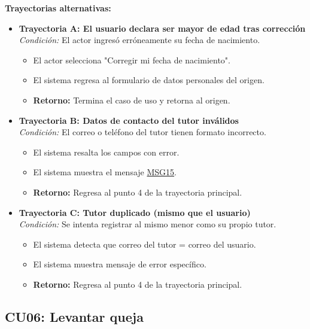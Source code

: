 \begin{appendices}
\textbf{Trayectorias alternativas:}
\begin{itemize}[leftmargin=*]
    \item \textbf{Trayectoria A: El usuario declara ser mayor de edad tras corrección} \\
    \textit{Condición:} El actor ingresó erróneamente su fecha de nacimiento.
    \begin{itemize}[nosep]
        \item[A-1:] El actor selecciona "Corregir mi fecha de nacimiento".
        \item[A-2:] El sistema regresa al formulario de datos personales del origen.
        \item \textbf{Retorno:} Termina el caso de uso y retorna al origen.
    \end{itemize}
    \item \textbf{Trayectoria B: Datos de contacto del tutor inválidos} \\
    \textit{Condición:} El correo o teléfono del tutor tienen formato incorrecto.
    \begin{itemize}[nosep]
        \item[B-1:] El sistema resalta los campos con error.
        \item[B-2:] El sistema muestra el mensaje \hyperlink{msg:MSG15}{MSG15}.
        \item \textbf{Retorno:} Regresa al punto 4 de la trayectoria principal.
    \end{itemize}
    \item \textbf{Trayectoria C: Tutor duplicado (mismo que el usuario)} \\
    \textit{Condición:} Se intenta registrar al mismo menor como su propio tutor.
    \begin{itemize}[nosep]
        \item[C-1:] El sistema detecta que correo del tutor = correo del usuario.
        \item[C-2:] El sistema muestra mensaje de error específico.
        \item \textbf{Retorno:} Regresa al punto 4 de la trayectoria principal.
    \end{itemize}
\end{itemize}

\newpage

\subsection{CU06: Levantar queja}


\end{appendices}
